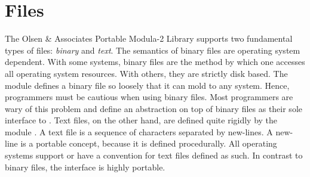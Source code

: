 %
%
%
%

\chapter{Files}
\label{TextIOChapter}\label{BinaryIOChapter}\label{FilesChapter}


The Olsen \& Associates Portable Modula-2 Library supports two
fundamental types of files: {\em binary} and {\em text}.
The semantics of binary files are operating system
dependent.  With some systems, binary files are the method by which one
accesses all operating system resources.  With others, they are
strictly disk based.  The module  defines
a binary file so loosely that it can mold to any system.
Hence, programmers must be cautious when using binary files.
Most programmers are wary of this problem and define an abstraction
on top of binary files as their sole interface to .
Text files, on the other hand, are defined quite rigidly by the
module .  A text file is a sequence of characters
separated by new-lines.  A  new-line is a portable concept,
because it is defined procedurally.  All operating systems support
or have a convention for text files defined as such.  In contrast
to binary files, the  interface is highly portable.

